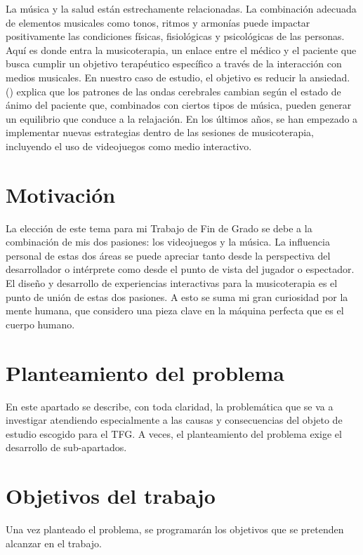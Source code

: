 La música y la salud están estrechamente relacionadas. La combinación adecuada de elementos musicales como tonos, ritmos y armonías puede impactar positivamente las condiciones físicas, fisiológicas y psicológicas de las personas. Aquí es donde entra la musicoterapia, un enlace entre el médico y el paciente que busca cumplir un objetivo terapéutico específico a través de la interacción con medios musicales. En nuestro caso de estudio, el objetivo es reducir la ansiedad. \citeauthor{KTN:2011} (\citeyear{KTN:2011}) explica que los patrones de las ondas cerebrales cambian según el estado de ánimo del paciente que, combinados con ciertos tipos de música, pueden generar un equilibrio que conduce a la relajación. En los últimos años, se han empezado a implementar nuevas estrategias dentro de las sesiones de musicoterapia, incluyendo el uso de videojuegos como medio interactivo.

\section{Motivación}

La elección de este tema para mi Trabajo de Fin de Grado se debe a la combinación de mis dos pasiones: los videojuegos y la música. La influencia personal de estas dos áreas se puede apreciar tanto desde la perspectiva del desarrollador o intérprete como desde el punto de vista del jugador o espectador. El diseño y desarrollo de experiencias interactivas para la musicoterapia es el punto de unión de estas dos pasiones. A esto se suma mi gran curiosidad por la mente humana, que considero una pieza clave en la máquina perfecta que es el cuerpo humano.

\section{Planteamiento del problema}

En este apartado se describe, con toda claridad, la problemática que se va a investigar atendiendo especialmente a las causas y consecuencias del objeto de estudio escogido para el TFG. A veces, el planteamiento del problema exige el desarrollo de sub-apartados.

\section{Objetivos del trabajo}

Una vez planteado el problema, se programarán los objetivos que se pretenden alcanzar en el trabajo.